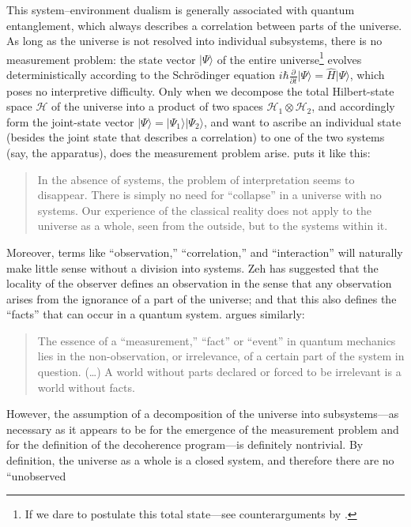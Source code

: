 \documentclass[twocolumn,rmp,aps,amsmath,amsfonts,noshowkeys,noshowpacs]{revtex4}
\newcommand{\ket}[1]{\ensuremath{|{#1\rangle}}}
\begin{document}
This system--environment dualism is generally associated with quantum
entanglement, which always describes a correlation between parts of
the universe. As long as the universe is not resolved into individual
subsystems, there is no measurement problem: the state vector
$\ket{\Psi}$ of the entire universe\footnote{If we dare to postulate
  this total state---see counterarguments by \citet{Auletta:2000:rv}.}
evolves deterministically according to the Schr\"odinger equation
$i\hbar \frac{\partial}{\partial t} \ket{\Psi} = \widehat{H}
\ket{\Psi}$, which poses no interpretive difficulty. Only when we
decompose the total Hilbert-state space $\mathcal{H}$ of the universe
into a product of two spaces $\mathcal{H}_1 \otimes \mathcal{H}_2$,
and accordingly form the joint-state vector
$\ket{\Psi}=\ket{\Psi_1}\ket{\Psi_2}$, and want to ascribe an
individual state (besides the joint state that describes a
correlation) to one of the two systems (say, the apparatus), does the
measurement problem arise.  \citet[p.~718]{Zurek:2002:ii} puts it
like this:
%
\begin{quote} {\small
    In the absence of systems, the problem of interpretation seems to
    disappear.  There is simply no need for ``collapse'' in a universe
    with no systems. Our experience of the classical reality does not
    apply to the universe as a whole, seen from the outside, but to
    the systems within it.}
\end{quote}
%
Moreover, terms like ``observation,'' ``correlation,'' and
``interaction'' will naturally make little sense without a division
into systems. Zeh has suggested that the locality of the observer
defines an observation in the sense that any observation arises from
the ignorance of a part of the universe; and that this also defines
the ``facts'' that can occur in a quantum system.
\citet[pp.~45--46]{Landsman:1995:oi} argues similarly:
%
\begin{quote} {\small 
    The essence of a ``measurement,'' ``fact'' or ``event'' in quantum
    mechanics lies in the non-observation, or irrelevance, of a
    certain part of the system in question. (\dots) A world without
    parts declared or forced to be irrelevant is a world without
    facts.}
\end{quote}
%
However, the assumption of a decomposition of the universe into
subsystems---as necessary as it appears to be for the emergence of the
measurement problem and for the definition of the decoherence
program---is definitely nontrivial. By definition, the universe as a
whole is a closed system, and therefore there are no ``unobserved
\end{document}
